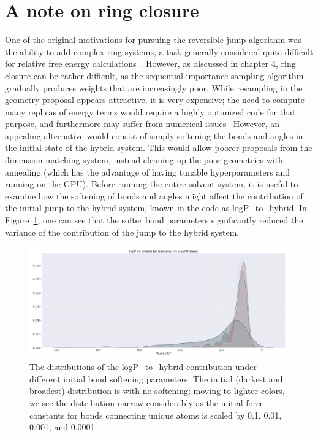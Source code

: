 \section{A note on ring closure}
%
One of the original motivations for pursuing the reversible jump algorithm was the ability to add complex ring systems, a task generally considered quite difficult for relative free energy calculations~\cite{Liu2015}.
%
However, as discussed in chapter 4, ring closure can be rather difficult, as the sequential importance sampling algorithm gradually produces weights that are increasingly poor.
%
While resampling in the geometry proposal appears attractive, it is very expensive; the need to compute many replicas of energy terms would require a highly optimized code for that purpose, and furthermore may suffer from numerical issues~\cite{Murray2016}
%
However, an appealing alternative would consist of simply softening the bonds and angles in the initial state of the hybrid system.
%
This would allow poorer proposals from the dimension matching system, instead cleaning up the poor geometries with annealing (which has the advantage of having tunable hyperparameters and running on the GPU).
%
Before running the entire solvent system, it is useful to examine how the softening of bonds and angles might affect the contribution of the initial jump to the hybrid system, known in the code as logP\_to\_hybrid.
%
In Figure~\ref{fig:bondsoftening}, one can see that the softer bond parameters significantly reduced the variance of the contribution of the jump to the hybrid system.
%
\begin{figure}
    \centering
    \includegraphics[width=\textwidth]{logP_tohybrid_changebond.png}
    \caption{The distributions of the logP\_to\_hybrid contribution under different initial bond softening parameters. The initial (darkest and broadest) distribution is with no softening; moving to lighter colors, we see the distribution narrow considerably as the initial force constants for bonds connecting unique atoms is scaled by 0.1, 0.01, 0.001, and 0.0001}
    \label{fig:bondsoftening}
\end{figure}
